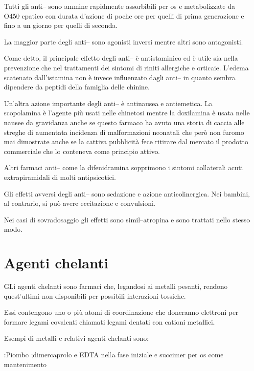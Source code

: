 Tutti gli anti-- sono ammine rapidmente assorbibili per os e metabolizzate da O450 epatico con durata d'azione di poche ore per quelli di prima generazione e fino a un giorno per quelli di seconda.

La maggior parte degli anti-- sono agonisti inversi mentre altri sono antagonisti.

Come detto, il principale effetto degli anti-- è antistaminico ed è utile sia nella prevenzione che nel trattamenti dei sintomi di riniti allergiche e orticaie. L'edema scatenato dall'istamina non è invece influenzato dagli anti-- in quanto sembra dipendere da peptidi della famiglia delle chinine.

Un'altra azione importante degli anti-- è antinausea e antiemetica. La scopolamina è l'agente più usati nelle chinetosi mentre la doxilamina è usata nelle nausee da gravidanza anche se questo farmaco ha avuto una storia di caccia alle streghe di aumentata incidenza di malformazioni neonatali che però non furomo mai dimostrate anche se la cattiva pubblicità fece ritirare dal mercato il prodotto commerciale che lo conteneva come principio attivo.

Altri farmaci anti-- come la difenidramina sopprimono i sintomi collaterali acuti extrapiramidali di molti antipsicotici.

Gli effetti avversi degli anti-- sono sedazione e azione anticolinergica. Nei bambini, al contrario, si può avere eccitazione e convulsioni.

Nei casi di sovradosaggio gli effetti sono simil--atropina e sono trattati nello stesso modo.

\section{Agenti chelanti}

GLi agenti chelanti sono farmaci che, legandosi ai metalli pesanti, rendono quest'ultimi non disponibili per possibili interazioni tossiche.

Essi contengono uno o più atomi di coordinazione che doneranno elettroni per formare legami covalenti chiamati legami dentati con cationi metallici.

Esempi di metalli e relativi agenti chelanti sono:

:Piombo
;dimercaprolo e EDTA nella fase iniziale e succimer per os come mantenimento

